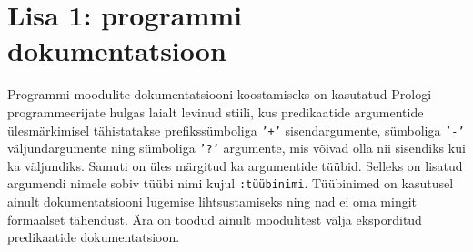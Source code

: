 \chapter*{Lisa 1: programmi dokumentatsioon}
\setcounter{chapter}{1}

Programmi moodulite dokumentatsiooni koostamiseks on kasutatud Prologi
programmeerijate hulgas laialt levinud stiili, kus predikaatide argumentide
ülesmärkimisel tähistatakse prefikssümboliga {\tt '+'} sisendargumente,
sümboliga {\tt '-'} väljundargumente ning sümboliga {\tt '?'} argumente, mis
võivad olla nii sisendiks kui ka väljundiks. Samuti on üles märgitud ka
argumentide tüübid. Selleks on lisatud argumendi nimele sobiv tüübi nimi kujul
{\tt :tüübinimi}. Tüübinimed on kasutusel ainult dokumentatsiooni
lugemise lihtsustamiseks ning nad ei oma mingit formaalset
tähendust. Ära on toodud ainult moodulitest välja eksporditud predikaatide
dokumentatsioon.

